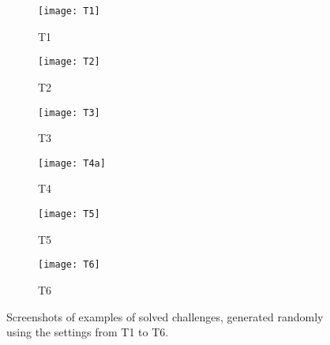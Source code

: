 \documentclass[conference]{IEEEtran}
\begin{document}
\begin{figure}[h]
\centering
\begin{subfigure}{.22\textwidth}
\centering
\texttt{[image: T1]}
\caption{T1}
\label{fig:T1}
\end{subfigure}
\begin{subfigure}{.22\textwidth}
\centering
\texttt{[image: T2]}
\caption{T2}
\label{fig:T2}
\end{subfigure}

\begin{subfigure}{.22\textwidth}
\centering
\texttt{[image: T3]}
\caption{T3}
\label{fig:T3}
\end{subfigure}
\begin{subfigure}{.22\textwidth}
\centering
\texttt{[image: T4a]}
\caption{T4}
\label{fig:T4}
\end{subfigure}

\begin{subfigure}{.22\textwidth}
\centering
\texttt{[image: T5]}
\caption{T5}
\label{fig:T5}
\end{subfigure}
\begin{subfigure}{.22\textwidth}
\centering
\texttt{[image: T6]}
\caption{T6}
\label{fig:T6}
\end{subfigure}
\caption{Screenshots of examples of solved challenges, generated randomly using the settings from T1 to T6.}
\label{fig:examples_captchas}
\end{figure}
\end{document}
